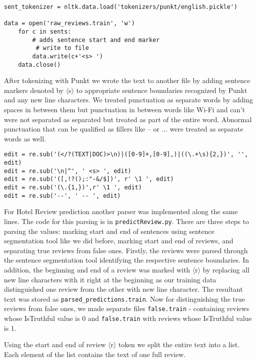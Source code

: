 \documentclass{article}
\begin{document}
{\small
\begin{verbatim}
sent_tokenizer = nltk.data.load('tokenizers/punkt/english.pickle')

data = open('raw_reviews.train', 'w')
    for c in sents:
        # adds sentence start and end marker
         # write to file
        data.write(c+'<s> ')
    data.close()
\end{verbatim}
}

After tokenizing with Punkt we wrote the text to another file by adding sentence markers denoted by $\langle$s$\rangle$ to appropriate sentence boundaries recognized by Punkt and any new line characters. We treated punctuation as separate words by adding spaces in between them but punctuation in between words like Wi-Fi and can't were not separated as separated but treated as part of the entire word. Abnormal punctuation that can be qualified as fillers like -- or ... were treated as separate words as well.

{\small
\begin{verbatim}
edit = re.sub('(</?(TEXT|DOC)>\n)|([0-9]+,[0-9],)|((\.+\s){2,})', '', edit)
edit = re.sub('\n|^', ' <s> ', edit)
edit = re.sub('([,!?();:"-&/$])', r' \1 ', edit)
edit = re.sub('(\.{1,})',r' \1 ', edit)
edit = re.sub('--', ' -- ', edit)
\end{verbatim}
}

For Hotel Review prediction another parser was implemented along the same lines. The code for this parsing is in \texttt{predictReview.py}. There are three steps to parsing the values: marking start and end of sentences using sentence segmentation tool like we did before, marking start and end of reviews, and separating true reviews from false ones. Firstly, the reviews were parsed through the sentence segmentation tool identifying the respective sentence boundaries. In addition, the beginning and end of a review was marked with $\langle$r$\rangle$ by replacing all new line characters with it right at the beginning as our training data distinguished one review from the other with new line character. The resultant text was stored as \texttt{parsed\_predictions.train}. Now for distinguishing the true reviews from false ones, we made separate files \texttt{false.train} - containing reviews whose IsTruthful value is 0 and \texttt{false.train} with reviews whose IsTruthful value is 1.\par

Using the start and end of review $\langle$r$\rangle$ token we split the entire text into a list. Each element of the list contains the text of one full review. 
\end{document}
